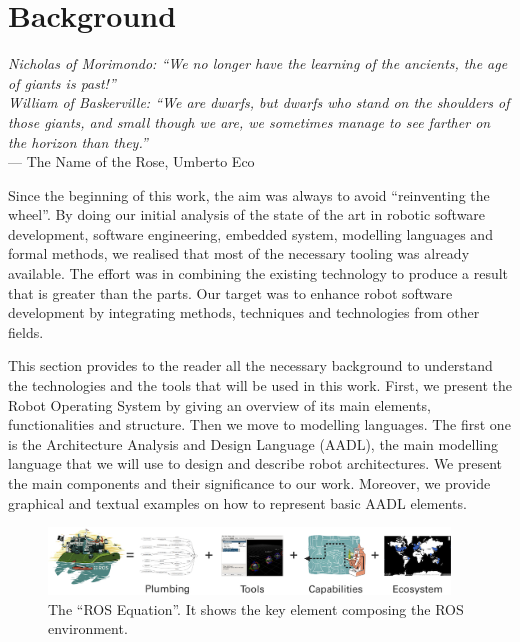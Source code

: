 \chapter[Background]{Background}\label{ch:Background}

\begin{flushright}{\slshape Nicholas of Morimondo: ``We no longer have the learning of the ancients, the age of giants is past!'' \\
William of Baskerville: ``We are dwarfs, but dwarfs who stand on the shoulders of those giants, and small though we are, we sometimes manage to see farther on the horizon than they.''} \\ \medskip
    ---  The Name of the Rose, Umberto Eco
\end{flushright}

Since the beginning of this work, the aim was always to avoid ``reinventing the wheel''. By doing our initial analysis of the state of the art in robotic software development, software engineering, embedded system, modelling languages and formal methods, we realised that most of the necessary tooling was already available. The effort was in combining the existing technology to produce a result that is greater than the parts. Our target was to enhance robot software development by integrating methods, techniques and technologies from other fields.

This section provides to the reader all the necessary background to understand the technologies and the tools that will be used in this work. First, we present the Robot Operating System by giving an overview of its main elements, functionalities and structure. Then we move to modelling languages. The first one is the Architecture Analysis and Design Language (AADL), the main modelling language that we will use to design and describe robot architectures. We present the main components and their significance to our work. Moreover, we provide graphical and textual examples on how to represent basic AADL elements. 

\newpage

\minitoc
\newpage

\begin{figure}[t]
    \centering
    \includegraphics[width=0.95\textwidth]{gfx/ros/ros_equation}
    \caption[The ``ROS Equation''.]{The ``ROS Equation''. It shows the key element composing the ROS environment. }\label{fig:ros}
\end{figure}

